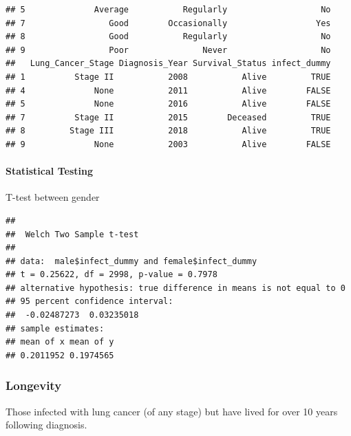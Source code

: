 \documentclass[
]{article}
\newenvironment{Shaded}{\begin{snugshade}}{\end{snugshade}}
\newcommand{\AttributeTok}[1]{\textcolor[rgb]{0.13,0.29,0.53}{#1}}
\newcommand{\FloatTok}[1]{\textcolor[rgb]{0.00,0.00,0.81}{#1}}
\newcommand{\FunctionTok}[1]{\textcolor[rgb]{0.13,0.29,0.53}{\textbf{#1}}}
\newcommand{\NormalTok}[1]{#1}
\newcommand{\OtherTok}[1]{\textcolor[rgb]{0.56,0.35,0.01}{#1}}
\newcommand{\SpecialCharTok}[1]{\textcolor[rgb]{0.81,0.36,0.00}{\textbf{#1}}}
\newcommand{\StringTok}[1]{\textcolor[rgb]{0.31,0.60,0.02}{#1}}
\begin{document}
\begin{verbatim}
## 5              Average           Regularly                   No
## 7                 Good        Occasionally                  Yes
## 8                 Good           Regularly                   No
## 9                 Poor               Never                   No
##   Lung_Cancer_Stage Diagnosis_Year Survival_Status infect_dummy
## 1          Stage II           2008           Alive         TRUE
## 4              None           2011           Alive        FALSE
## 5              None           2016           Alive        FALSE
## 7          Stage II           2015        Deceased         TRUE
## 8         Stage III           2018           Alive         TRUE
## 9              None           2003           Alive        FALSE
\end{verbatim}

\paragraph{Statistical Testing}\label{statistical-testing}

T-test between gender

\begin{Shaded}
\end{Shaded}

\begin{verbatim}
## 
##  Welch Two Sample t-test
## 
## data:  male$infect_dummy and female$infect_dummy
## t = 0.25622, df = 2998, p-value = 0.7978
## alternative hypothesis: true difference in means is not equal to 0
## 95 percent confidence interval:
##  -0.02487273  0.03235018
## sample estimates:
## mean of x mean of y 
## 0.2011952 0.1974565
\end{verbatim}

\subsubsection{Longevity}\label{longevity}

Those infected with lung cancer (of any stage) but have lived for over
10 years following diagnosis.
\end{document}
